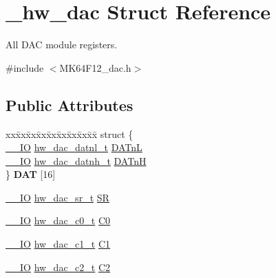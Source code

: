 \hypertarget{struct__hw__dac}{}\section{\+\_\+hw\+\_\+dac Struct Reference}
\label{struct__hw__dac}


All D\+AC module registers.  




{\ttfamily \#include $<$M\+K64\+F12\+\_\+dac.\+h$>$}

\subsection*{Public Attributes}
\begin{DoxyCompactItemize}
\item 
\begin{tabbing}
xx\=xx\=xx\=xx\=xx\=xx\=xx\=xx\=xx\=\kill
struct \{\\
\>\hyperlink{core__sc300_8h_aec43007d9998a0a0e01faede4133d6be}{\_\_IO} \hyperlink{union__hw__dac__datnl}{hw\_dac\_datnl\_t} \hyperlink{struct__hw__dac_a453ec3e79381cff97e0cf8d8bb9c912b}{DATnL}\\
\>\hyperlink{core__sc300_8h_aec43007d9998a0a0e01faede4133d6be}{\_\_IO} \hyperlink{union__hw__dac__datnh}{hw\_dac\_datnh\_t} \hyperlink{struct__hw__dac_a70491d703f0dc2b014d2e6bb6a4591a8}{DATnH}\\
\} {\bfseries DAT} \mbox{[}16\mbox{]}\hypertarget{struct__hw__dac_a7d5af9dbceed83854eb41a2859d1a826}{}\label{struct__hw__dac_a7d5af9dbceed83854eb41a2859d1a826}
\\

\end{tabbing}\item 
\hyperlink{core__sc300_8h_aec43007d9998a0a0e01faede4133d6be}{\+\_\+\+\_\+\+IO} \hyperlink{union__hw__dac__sr}{hw\+\_\+dac\+\_\+sr\+\_\+t} \hyperlink{struct__hw__dac_a0320f3455f922d2d918163a0a750b60d}{SR}
\item 
\hyperlink{core__sc300_8h_aec43007d9998a0a0e01faede4133d6be}{\+\_\+\+\_\+\+IO} \hyperlink{union__hw__dac__c0}{hw\+\_\+dac\+\_\+c0\+\_\+t} \hyperlink{struct__hw__dac_a9236a838c2f58bf9b4091214e1124639}{C0}
\item 
\hyperlink{core__sc300_8h_aec43007d9998a0a0e01faede4133d6be}{\+\_\+\+\_\+\+IO} \hyperlink{union__hw__dac__c1}{hw\+\_\+dac\+\_\+c1\+\_\+t} \hyperlink{struct__hw__dac_a43801d062f37cccbd7cf4d0aef22986f}{C1}
\item 
\hyperlink{core__sc300_8h_aec43007d9998a0a0e01faede4133d6be}{\+\_\+\+\_\+\+IO} \hyperlink{union__hw__dac__c2}{hw\+\_\+dac\+\_\+c2\+\_\+t} \hyperlink{struct__hw__dac_a5ab203493ec2b6251baa9c3d6ca63b9d}{C2}
\end{DoxyCompactItemize}



